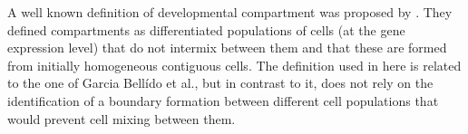A well known definition of developmental compartment was proposed by \citet{Garcia-Bellido1973}. They defined compartments as differentiated populations of cells (at the gene expression level) that do not intermix between them and that these are formed from initially homogeneous contiguous cells. 
The definition used in here is related to the one of Garcia Bell\'{i}do et al., but in contrast to it, does not rely on the identification of a boundary formation between different cell populations that would prevent cell mixing between them.

%



